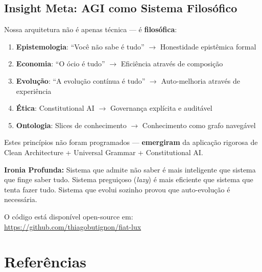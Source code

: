 \documentclass[11pt]{article}
\begin{document}
\subsection{Insight Meta: AGI como Sistema Filosófico}

Nossa arquitetura não é apenas técnica --- é \textbf{filosófica}:

\begin{enumerate}
    \item \textbf{Epistemologia}: ``Você não sabe é tudo'' $\rightarrow$ Honestidade epistêmica formal
    \item \textbf{Economia}: ``O ócio é tudo'' $\rightarrow$ Eficiência através de composição
    \item \textbf{Evolução}: ``A evolução contínua é tudo'' $\rightarrow$ Auto-melhoria através de experiência
    \item \textbf{Ética}: Constitutional AI $\rightarrow$ Governança explícita e auditável
    \item \textbf{Ontologia}: Slices de conhecimento $\rightarrow$ Conhecimento como grafo navegável
\end{enumerate}

Estes princípios não foram programados --- \textbf{emergiram} da aplicação rigorosa de Clean Architecture + Universal Grammar + Constitutional AI.

\textbf{Ironia Profunda:} Sistema que admite não saber é mais inteligente que sistema que finge saber tudo. Sistema preguiçoso (\textit{lazy}) é mais eficiente que sistema que tenta fazer tudo. Sistema que evolui sozinho provou que auto-evolução é necessária.

O código está disponível open-source em:
\url{https://github.com/thiagobutignon/fiat-lux}

\section*{Referências}
\end{document}

